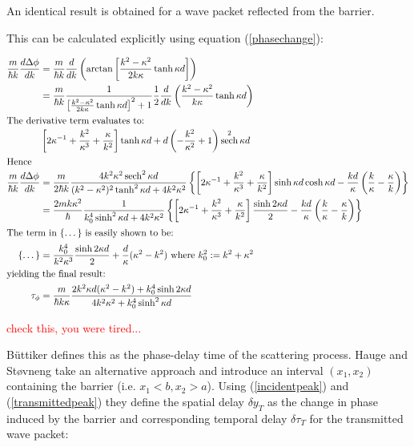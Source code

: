 \documentclass{article}
\DeclareMathOperator{\sech}{sech}
\begin{document}
\noindent An identical result is obtained for a wave packet reflected from the barrier.

\noindent This can be calculated explicitly using equation (\ref{phasechange}):

\begin{align}
	\frac{m}{\hbar k}\frac{d\Delta\phi}{dk}&=\frac{m}{\hbar k}\frac{d}{dk}\left(\arctan{\left[\frac{k^2-\kappa^2}{2k\kappa}\tanh{\kappa d}\right]}\right) \\
					       &=\frac{m}{\hbar k}\frac{1}{\left[\frac{k^2-\kappa^2}{2k\kappa}\tanh{\kappa d}\right]^2+1}\frac{1}{2}\frac{d}{dk}\left(\frac{k^2-\kappa^2}{k\kappa}\tanh{\kappa d}\right) \\ \intertext{The derivative term evaluates to:}
					       &\left[2\kappa^{-1}+\frac{k^2}{\kappa^3}+\frac{\kappa}{k^2}\right]\tanh{\kappa d} + d\left(-\frac{k^2}{\kappa^2}+1\right)\sech^2{\kappa d}\\ \intertext{Hence}
	\frac{m}{\hbar k}\frac{d\Delta\phi}{dk}&=\frac{m}{2\hbar k}\frac{4k^2\kappa^2\sech^2{\kappa d}}{(k^2-\kappa^2)^2\tanh^2{\kappa d}+4k^2\kappa^2}\left\{\left[2\kappa^{-1}+\frac{k^2}{\kappa^3}+\frac{\kappa}{k^2}\right]\sinh{\kappa d}\cosh{\kappa d}-\frac{kd}{\kappa}\left(\frac{k}{\kappa}-\frac{\kappa}{k}\right)\right\}\\
					       &=\frac{2mk\kappa^2}{\hbar}\frac{1}{k_0^4\sinh^2{\kappa d}+4k^2\kappa^2}\left\{\left[2\kappa^{-1}+\frac{k^2}{\kappa^3}+\frac{\kappa}{k^2}\right]\frac{\sinh{2\kappa d}}{2}-\frac{kd}{\kappa}\left(\frac{k}{\kappa}-\frac{\kappa}{k}\right)\right\} \\ \intertext{The term in \{\dots\} is easily shown to be:}
	\{\dots\} &= \frac{k_0^4}{k^2\kappa^3}\frac{\sinh{2\kappa d}}{2}+\frac{d}{\kappa}(\kappa^2-k^2) \text{ where } k_0^2 := k^2+\kappa^2\\ \intertext{yielding the final result:}
	\tau_\phi &= \frac{m}{\hbar k \kappa}\frac{2k^2\kappa d(\kappa^2-k^2)+k_0^4\sinh{2\kappa d}}{4k^2\kappa^2+k_0^4\sinh^2{\kappa d}} \label{phasedelaytime}
\end{align}

\textcolor{red}{check this, you were tired...}

\noindent B{\"u}ttiker defines this as the phase-delay time of the scattering process. Hauge and St{\o}vneng take an alternative approach and introduce an interval $(x_1, x_2)$ containing the barrier (i.e. $x_1<b,x_2>a$). Using (\ref{incidentpeak}) and (\ref{transmittedpeak}) they define the spatial delay $\delta y_T$ as the change in phase induced by the barrier and corresponding temporal delay $\delta\tau_T$ for the transmitted wave packet:
\end{document}
